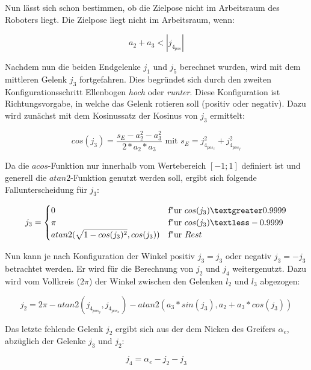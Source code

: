 Nun lässt sich schon bestimmen, ob die Zielpose nicht im Arbeitsraum des Roboters liegt. Die Zielpose liegt nicht im Arbeitsraum, wenn:

\begin{equation}
a_2 + a_3 < |j_{4_{pos}}|
\label{eq:30}
\end{equation}

Nachdem nun die beiden Endgelenke $j_1$ und $j_5$ berechnet wurden, wird mit dem mittleren Gelenk $j_3$ fortgefahren. Dies begründet sich durch den zweiten Konfigurationsschritt Ellenbogen \textit{hoch} oder \textit{runter}. Diese Konfiguration ist Richtungsvorgabe, in welche das Gelenk rotieren soll (positiv oder negativ). Dazu wird zunächst mit dem Kosinussatz der Kosinus von $j_3$ ermittelt:

\begin{equation}
cos(j_3) = \dfrac{s_E - a_2^2 - a_3^2}{2 * a_2 * a_3} \text{ mit } s_E = j_{4_{pos_x}}^2 + j_{4_{pos_y}}^2 
\label{eq:32}
\end{equation}

Da die $acos$-Funktion nur innerhalb vom Wertebereich $[-1;1]$ definiert ist und generell die $atan2$-Funktion genutzt werden soll, ergibt sich folgende Fallunterscheidung für $j_3$:

\begin{equation}
j_3 = 
\begin{cases}
0  & \text{f"ur } cos(j_3) \textgreater 0.9999 \\
\pi & \text{f"ur } cos(j_3) \textless -0.9999 \\
atan2(\sqrt{1 - cos(j_3)^2}, cos(j_3))  & \text{f"ur } Rest
\end{cases}
\label{eq:33}
\end{equation}

Nun kann je nach Konfiguration der Winkel positiv $j_3 = j_3$ oder negativ $j_3 = -j_3$ betrachtet werden. Er wird für die Berechnung von $j_2$ und $j_4$ weitergenutzt. Dazu wird vom Vollkreis ($2\pi$) der Winkel zwischen den Gelenken $l_2$ und $l_3$ abgezogen:

\begin{equation}
j_2 = 2\pi - atan2(j_{4_{pos_y}}, j_{4_{pos_x}}) - atan2(a_3 * sin(j_3), a_2 + a_3 * cos(j_3))
\label{eq:34}
\end{equation}

Das letzte fehlende Gelenk $j_2$ ergibt sich aus der dem Nicken des Greifers $\alpha_{e}$, abzüglich der Gelenke $j_3$ und $j_2$:

\begin{equation}
j_4 =  \alpha_{e} - j_2 - j_3
\label{eq:345}
\end{equation}

